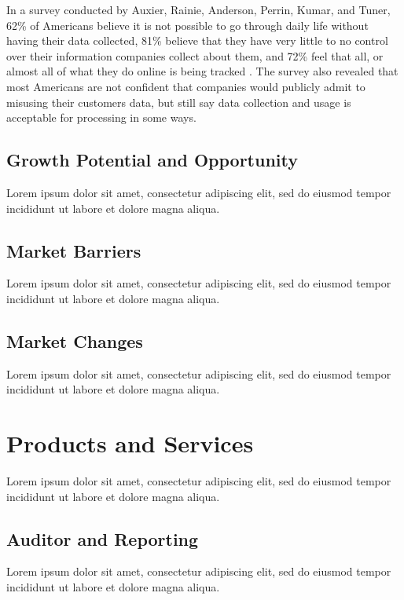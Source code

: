 In a survey conducted by Auxier, Rainie, Anderson, Perrin, Kumar, and Tuner, 62\% of Americans believe it is not possible to go through daily life without having their data collected, 81\% believe that they have very little to no control over their information companies collect about them, and 72\% feel that all, or almost all of what they do online is being tracked \cite{pewresearch.2019}. The survey also revealed that most Americans are not confident that companies would publicly admit to misusing their customers data, but still say data collection and usage is acceptable for processing in some ways.

\subsection{Growth Potential and Opportunity}

Lorem ipsum dolor sit amet, consectetur adipiscing elit, sed do eiusmod tempor incididunt ut labore et dolore magna aliqua.

\subsection{Market Barriers}

Lorem ipsum dolor sit amet, consectetur adipiscing elit, sed do eiusmod tempor incididunt ut labore et dolore magna aliqua.

\subsection{Market Changes}

Lorem ipsum dolor sit amet, consectetur adipiscing elit, sed do eiusmod tempor incididunt ut labore et dolore magna aliqua.


\section{Products and Services}
Lorem ipsum dolor sit amet, consectetur adipiscing elit, sed do eiusmod tempor incididunt ut labore et dolore magna aliqua.


\subsection{Auditor and Reporting}
Lorem ipsum dolor sit amet, consectetur adipiscing elit, sed do eiusmod tempor incididunt ut labore et dolore magna aliqua.


